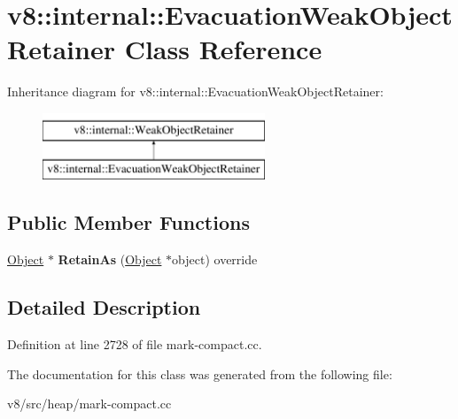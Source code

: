\hypertarget{classv8_1_1internal_1_1EvacuationWeakObjectRetainer}{}\section{v8\+:\+:internal\+:\+:Evacuation\+Weak\+Object\+Retainer Class Reference}
\label{classv8_1_1internal_1_1EvacuationWeakObjectRetainer}
Inheritance diagram for v8\+:\+:internal\+:\+:Evacuation\+Weak\+Object\+Retainer\+:\begin{figure}[H]
\begin{center}
\leavevmode
\includegraphics[height=2.000000cm]{classv8_1_1internal_1_1EvacuationWeakObjectRetainer}
\end{center}
\end{figure}
\subsection*{Public Member Functions}
\begin{DoxyCompactItemize}
\item 
\mbox{\label{classv8_1_1internal_1_1EvacuationWeakObjectRetainer_ad23436694bab8ba21aeeb0e133d09a4a}} 
\mbox{\hyperlink{classv8_1_1internal_1_1Object}{Object}} $\ast$ {\bfseries Retain\+As} (\mbox{\hyperlink{classv8_1_1internal_1_1Object}{Object}} $\ast$object) override
\end{DoxyCompactItemize}


\subsection{Detailed Description}


Definition at line 2728 of file mark-\/compact.\+cc.



The documentation for this class was generated from the following file\+:\begin{DoxyCompactItemize}
\item 
v8/src/heap/mark-\/compact.\+cc\end{DoxyCompactItemize}
